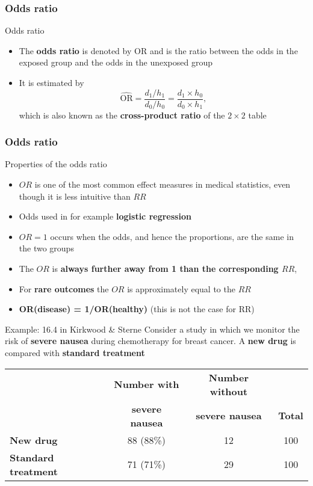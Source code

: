 \documentclass[compress, notes=hide]{beamer}
\newcommand{\hl}[1]{\textbf{#1}}
\begin{document}
\begin{frame}
				  \frametitle{Odds ratio} 
\begin{block}{Odds ratio}
\begin{itemize}
\item The \hl{odds ratio} is denoted by $\mathrm{OR}$ and is the
  ratio between the odds in the exposed group and the odds in the
  unexposed group
\item It is estimated by
\begin{equation}
\widehat{\mathrm{OR}} = \frac{d_1/h_1}{d_0/h_0} = \frac{d_1 \times h_0}{d_0 \times h_1},\nonumber
\end{equation}
which is also known as the \hl{cross-product ratio} of the $2 \times 2$ table
\end{itemize}
\end{block}
\end{frame}

\begin{frame}
				  \frametitle{Odds ratio} 
\begin{block}{Properties of the odds ratio}
\begin{itemize}
\item $OR$ is one of the most common effect measures in medical
  statistics, even though it is less intuitive than $RR$
\item Odds used in for example \hl{logistic regression}
\item{$OR=1$ occurs when the odds, and hence the proportions,
    are the same in the two groups}
\item{The $OR$ is \hl{always further away from 1 than the
    corresponding $RR$},}
\item{For \hl{rare outcomes} the $OR$ is approximately equal to
    the $RR$} 
\item \hl{OR(disease) = 1/OR(healthy)} (this is not the case for RR)
\end{itemize}
\end{block}
\end{frame}



\begin{frame}
\begin{block}{Example: 16.4 in Kirkwood \& Sterne}
  Consider a study in which we monitor the risk of \hl{severe
    nausea} during chemotherapy for breast cancer. A \hl{new drug}
  is compared with \hl{standard treatment}
\begin{table}
\begin{small}
\begin{tabular}{lccc}
\hline
& \textbf{Number with} & \textbf{Number without} &
\\
& \textbf{severe nausea} & \textbf{severe nausea} & \textbf{Total}
\\
\hline
\textbf{New drug} & 88 (88\%) & 12 & 100
\\
\textbf{Standard treatment} & 71 (71\%) &  29 & 100
\\
\hline
\end{tabular}
\end{small}
\end{table}
\end{block}
\end{frame}
\end{document}
